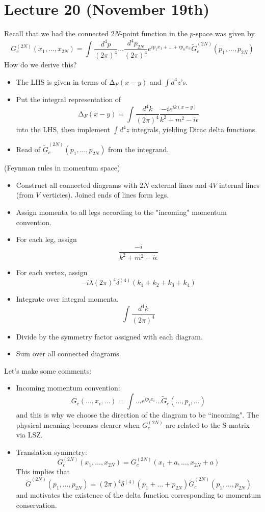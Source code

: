 \section{Lecture 20 (November 19th)}
\begin{recall}
Recall that we had the connected $2N$-point function in the $p$-space was given by
\[G_{c}^{(2N)}(x_1,\ldots ,x_{2N})=\int \dfrac{d^{4}p}{(2\pi )^{4}}\ldots \dfrac{d^{4}p_{2N}}{(2\pi )^{4}}e^{ip_1x_1+\ldots +ip_{n}x_{n}}\tilde{G}_{c}^{(2N)}(p_1,\ldots ,p_{2N})\]
How do we derive this?
\begin{itemize}
\item[(i)] The LHS is given in terms of $\mathrm{\Delta }_{F}(x-y)$ and $\int d^{4}z$'s.
\item[(ii)] Put the integral representation of 
\[\mathrm{\Delta }_{F}(x-y)=\int \dfrac{d^{4}k}{(2\pi )^{4}}\dfrac{-ie^{ik(x-y)}}{k^2+m^2-i\epsilon }\]
into the LHS, then implement $\int d^{4}z$ integrals, yielding Dirac delta functions. 
\item[(iii)] Read of $\tilde{G}_{c}^{(2N)}(p_1,\ldots ,p_{2N})$ from the integrand. 
\end{itemize}
\end{recall}
\vspace{2ex}
\begin{thm}
(Feynman rules in momentum space) 
\begin{itemize}
\item[(i)] Construct all connected diagrams with $2N$ external lines and $4V$ internal lines (from $V$ verticies). Joined ends of lines form legs. 
\item[(ii)] Assign momenta to all legs according to the "incoming" momentum convention. 
\item[(iii)] For each leg, assign 
\[\dfrac{-i}{k^2+m^2-i\epsilon }\]
\item[(iv)] For each vertex, assign 
\[-i\lambda (2\pi )^{4}\delta ^{(4)}(k_1+k_2+k_3+k_4)\]
\item[(v)] Integrate over integral momenta.
\[\int \dfrac{d^{4}k}{(2\pi )^{4}}\]
\item[(vi)] Divide by the symmetry factor assigned with each diagram.
\item[(vii)] Sum over all connected diagrams.
\end{itemize}
Let's make some comments:
\begin{itemize}
\item[(i)] Incoming momentum convention:
\[G_{c}(\ldots ,x_{i},\ldots )=\int \ldots e^{ip_{i}x_{i}}\ldots \tilde{G}_{c}(\ldots ,p_{i},\ldots )\]
and this is why we choose the direction of the diagram to be ``incoming". The physical meaning becomes clearer when $G_{c}^{(2N)}$ are related to the S-matrix via LSZ. 
\item[(ii)] Translation symmetry:
\[G^{(2N)}_{c}(x_1,\ldots ,x_{2N})=G_{c}^{(2N)}(x_1+a,\ldots ,x_{2N}+a)\]
This implies that
\[\tilde{G}^{(2N)}(p_1,\ldots ,p_{2N})=(2\pi )^{4}\delta ^{(4)}(p_1+\ldots +p_{2N})\tilde{G}^{(2N)}_{c}(p_1,\ldots ,p_{2N})\]
and motivates the existence of the delta function corresponding to momentum conservation.
\end{itemize}
\end{thm}
